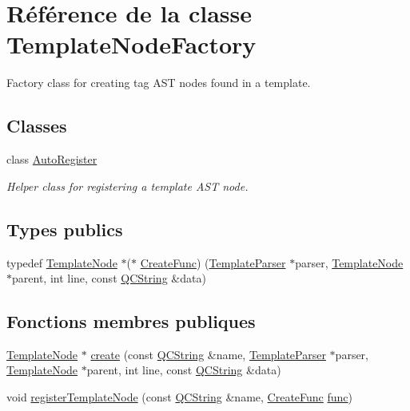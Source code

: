 \hypertarget{class_template_node_factory}{}\section{Référence de la classe Template\+Node\+Factory}
\label{class_template_node_factory}


Factory class for creating tag A\+S\+T nodes found in a template.  


\subsection*{Classes}
\begin{DoxyCompactItemize}
\item 
class \hyperlink{class_template_node_factory_1_1_auto_register}{Auto\+Register}
\begin{DoxyCompactList}\small\item\em Helper class for registering a template A\+S\+T node. \end{DoxyCompactList}\end{DoxyCompactItemize}
\subsection*{Types publics}
\begin{DoxyCompactItemize}
\item 
typedef \hyperlink{class_template_node}{Template\+Node} $\ast$($\ast$ \hyperlink{class_template_node_factory_a59ae33c1e37ddecd982358a5417fab31}{Create\+Func}) (\hyperlink{class_template_parser}{Template\+Parser} $\ast$parser, \hyperlink{class_template_node}{Template\+Node} $\ast$parent, int line, const \hyperlink{class_q_c_string}{Q\+C\+String} \&data)
\end{DoxyCompactItemize}
\subsection*{Fonctions membres publiques}
\begin{DoxyCompactItemize}
\item 
\hyperlink{class_template_node}{Template\+Node} $\ast$ \hyperlink{class_template_node_factory_acad608d0e42a69f2e4ad3caa05388d32}{create} (const \hyperlink{class_q_c_string}{Q\+C\+String} \&name, \hyperlink{class_template_parser}{Template\+Parser} $\ast$parser, \hyperlink{class_template_node}{Template\+Node} $\ast$parent, int line, const \hyperlink{class_q_c_string}{Q\+C\+String} \&data)
\item 
void \hyperlink{class_template_node_factory_a1a032751feb62597c052da0548b56e95}{register\+Template\+Node} (const \hyperlink{class_q_c_string}{Q\+C\+String} \&name, \hyperlink{class_template_node_factory_a59ae33c1e37ddecd982358a5417fab31}{Create\+Func} \hyperlink{036__link_8c_affb6da6cff1b57cdf8efc0123dceac9b}{func})
\end{DoxyCompactItemize}
